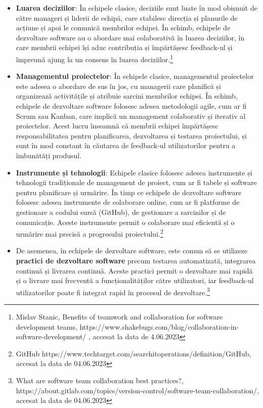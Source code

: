 \documentclass[a4paper, 12pt]{article}
\begin{document}
\begin {itemize}

	\item \textbf{Luarea deciziilor}: În echipele clasice, deciziile sunt luate în mod obișnuit de către manageri și liderii de echipă, care stabilesc direcția și planurile de acțiune și apoi le comunică membrilor echipei. În schimb, echipele de dezvoltare software au o abordare mai colaborativă în luarea deciziilor, în care membrii echipei își aduc contribuția și împărtășesc feedback-ul și împreună ajung la un consens în luarea deciziilor.\footnote{Mislav Stanic, Benefits of teamwork and collaboration for software development teams, https://www.shakebugs.com/blog/collaboration-in-software-development/ , accesat la data de 4.06.2023}

	\item\textbf{Managementul proiectelor}: În echipele clasice, managementul proiectelor este adesea o abordare de sus în jos, cu managerii care planifică și organizează activitățile și atribuie sarcini membrilor echipei. În schimb, echipele de dezvoltare software folosesc adesea metodologii agile, cum ar fi Scrum sau Kanban, care implică un management colaborativ și iterativ al proiectelor. Acest lucru înseamnă că membrii echipei împărtășesc responsabilitatea pentru planificarea, dezvoltarea și testarea proiectului, și sunt în mod constant în căutarea de feedback-ul utilizatorilor pentru a îmbunătăți produsul.

	\item \textbf{ Instrumente și tehnologii}: Echipele clasice folosesc adesea instrumente și tehnologii tradiționale de management de proiect, cum ar fi tabele și software pentru planificare și urmărire. În timp ce echipele de dezvoltare software folosesc adesea instrumente de colaborare online, cum ar fi platforme de gestionare a codului sursă (GitHub), de gestionare a sarcinilor și de comunicație. Aceste instrumente permit o colaborare mai eficientă și o urmărire mai precisă a progresului proiectului.\footnote{GitHub
https://www.techtarget.com/searchitoperations/definition/GitHub, accesat la data de 04.06.2023}

	\item De asemenea, în echipele de dezvoltare software, este comun să se utilizeze \textbf{practici de dezvoltare software} precum testarea automatizată, integrarea continuă și livrarea continuă. Aceste practici permit o dezvoltare mai rapidă și o livrare mai frecventă a funcționalităților către utilizatori, iar feedback-ul utilizatorilor poate fi integrat rapid în procesul de dezvoltare.\footnote{What are software team collaboration best practices?, https://about.gitlab.com/topics/version-control/software-team-collaboration/, accesat la data de 04.06.2023}


\end{itemize}
\end{document}
